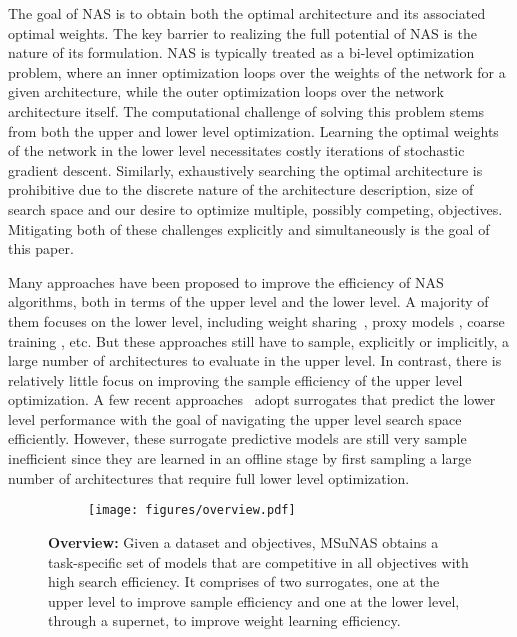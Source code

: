 \documentclass[runningheads]{llncs}
\def\ourmethod{MSuNAS}
\begin{document}
The goal of NAS is to obtain both the optimal architecture and its associated optimal weights. The key barrier to realizing the full potential of NAS is the nature of its formulation. NAS is typically treated as a bi-level optimization problem, where an inner optimization loops over the weights of the network for a given architecture, while the outer optimization loops over the network architecture itself. The computational challenge of solving this problem stems from both the upper and lower level optimization. Learning the optimal weights of the network in the lower level necessitates costly iterations of stochastic gradient descent. Similarly, exhaustively searching the optimal architecture is prohibitive due to the discrete nature of the architecture description, size of search space and our desire to optimize multiple, possibly competing, objectives. Mitigating both of these challenges explicitly and simultaneously is the goal of this paper.

Many approaches have been proposed to improve the efficiency of NAS algorithms, both in terms of the upper level and the lower level. A majority of them focuses on the lower level, including weight sharing~\cite{baker2017accelerating,enas,darts}, proxy models \cite{nasnet,amoebanet}, coarse training \cite{mnasnet}, etc. But these approaches still have to sample, explicitly or implicitly, a large number of architectures to evaluate in the upper level. In contrast, there is relatively little focus on improving the sample efficiency of the upper level optimization. A few recent approaches~\cite{PNAS,chamnet} adopt surrogates that predict the lower level performance with the goal of navigating the upper level search space efficiently. However, these surrogate predictive models are still very sample inefficient since they are learned in an offline stage by first sampling a large number of architectures that require full lower level optimization.

\begin{figure}[t]
    \centering
    \begin{subfigure}{0.95\textwidth}
    \centering
    \texttt{[image: figures/overview.pdf]}
    \end{subfigure}
\caption{\textbf{Overview:} Given a dataset and objectives, \ourmethod{} obtains a task-specific set of models that are competitive in all objectives with high search efficiency. It comprises of two surrogates, one at the upper level to improve sample efficiency and one at the lower level, through a supernet, to improve weight learning efficiency.\label{fig:overview}}
\end{figure}
\end{document}
